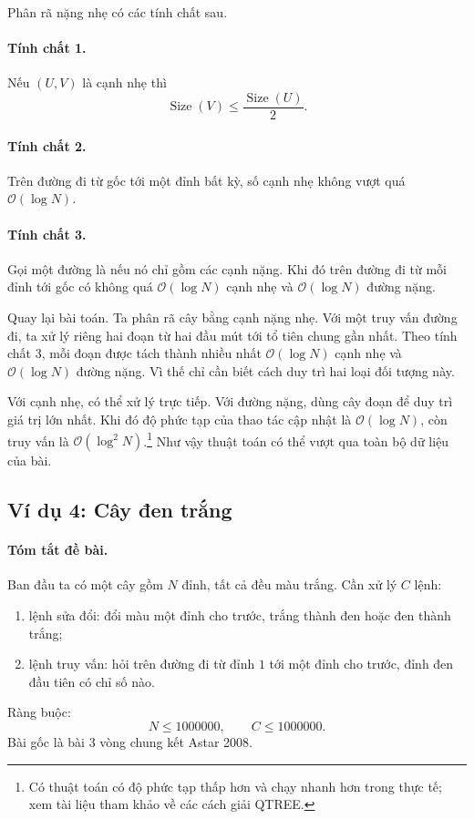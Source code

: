 \documentclass[11pt]{article}
\newcommand{\Oh}{\mathcal{O}}
\newcommand{\Size}{\operatorname{Size}}
\begin{document}
Phân rã nặng nhẹ có các tính chất sau.

\paragraph{Tính chất 1.}
Nếu \((U,V)\) là cạnh nhẹ thì
\[
  \Size(V)\le \frac{\Size(U)}{2}.
\]

\paragraph{Tính chất 2.}
Trên đường đi từ gốc tới một đỉnh bất kỳ, số cạnh nhẹ không vượt quá
\(\Oh(\log N)\).

\paragraph{Tính chất 3.}
Gọi một đường là  nếu nó chỉ gồm các cạnh nặng. Khi đó trên
đường đi từ mỗi đỉnh tới gốc có không quá \(\Oh(\log N)\) cạnh nhẹ và
\(\Oh(\log N)\) đường nặng.

Quay lại bài toán. Ta phân rã cây bằng cạnh nặng nhẹ. Với một truy vấn đường
đi, ta xử lý riêng hai đoạn từ hai đầu mút tới tổ tiên chung gần nhất. Theo
tính chất 3, mỗi đoạn được tách thành nhiều nhất \(\Oh(\log N)\) cạnh nhẹ và
\(\Oh(\log N)\) đường nặng. Vì thế chỉ cần biết cách duy trì hai loại đối
tượng này.

Với cạnh nhẹ, có thể xử lý trực tiếp. Với đường nặng, dùng cây đoạn để duy trì
giá trị lớn nhất. Khi đó độ phức tạp của thao tác cập nhật là \(\Oh(\log N)\),
còn truy vấn là \(\Oh(\log^2 N)\).\footnote{Có thuật toán có độ phức tạp thấp
hơn và chạy nhanh hơn trong thực tế; xem tài liệu tham khảo về các cách giải
QTREE.} Như vậy thuật toán có thể vượt qua toàn bộ dữ liệu của bài.

\subsection{Ví dụ 4: Cây đen trắng}

\paragraph{Tóm tắt đề bài.}
Ban đầu ta có một cây gồm \(N\) đỉnh, tất cả đều màu trắng. Cần xử lý \(C\)
lệnh:
\begin{enumerate}
  \item lệnh sửa đổi: đổi màu một đỉnh cho trước, trắng thành đen hoặc đen
  thành trắng;
  \item lệnh truy vấn: hỏi trên đường đi từ đỉnh \(1\) tới một đỉnh cho trước,
  đỉnh đen đầu tiên có chỉ số nào.
\end{enumerate}
Ràng buộc:
\[
  N\le 1000000,\qquad C\le 1000000.
\]
Bài gốc là bài 3 vòng chung kết Astar 2008.
\end{document}
